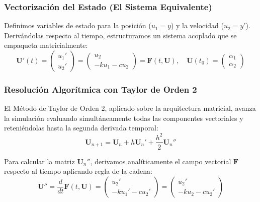 \documentclass[12pt]{article}
\begin{document}
\subsubsection*{Vectorización del Estado (El Sistema Equivalente)}
Definimos variables de estado para la posición ($u_1 = y$) y la velocidad ($u_2 = y'$). Derivándolas respecto al tiempo, estructuramos un sistema acoplado que se empaqueta matricialmente:
\begin{equation}
\mathbf{U}'(t) = 
\begin{pmatrix}
    u_1' \\ u_2'
\end{pmatrix}
=
\begin{pmatrix}
    u_2 \\ -k u_1 - c u_2
\end{pmatrix}
= \mathbf{F}(t, \mathbf{U}), 
\quad \mathbf{U}(t_0) = \begin{pmatrix} \alpha_1 \\ \alpha_2 \end{pmatrix}
\end{equation}

\subsubsection*{Resolución Algorítmica con Taylor de Orden 2}
El Método de Taylor de Orden 2, aplicado sobre la arquitectura matricial, avanza la simulación evaluando simultáneamente todas las componentes vectoriales y reteniéndolas hasta la segunda derivada temporal:
\begin{equation}
    \mathbf{U}_{n+1} = \mathbf{U}_n + h \mathbf{U}_n' + \frac{h^2}{2} \mathbf{U}_n''
\end{equation}

Para calcular la matriz $\mathbf{U}_n''$, derivamos analíticamente el campo vectorial $\mathbf{F}$ respecto al tiempo aplicando regla de la cadena:
\begin{equation}
\mathbf{U}'' = \frac{d}{dt} \mathbf{F}(t, \mathbf{U}) = 
\begin{pmatrix}
    u_2' \\ -k u_1' - c u_2'
\end{pmatrix}
=
\begin{pmatrix}
    u_2' \\ -k u_2 - c u_2'
\end{pmatrix}
\end{equation}
\end{document}
